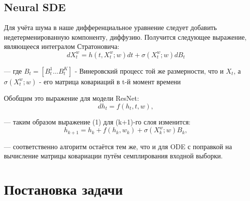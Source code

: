 \documentclass{article}
\begin{document}
   \subsection{Neural SDE}
      \par Для учёта шума в наше дифференциальное уравнение следует добавить недетерменированную компоненту, диффузию. Получится следующее выражение, являющееся интегралом Стратоновича:
      \begin{equation} dX_t^w = h(t, X_t^w; w) dt + \sigma(X_t^w;w) dB_t     \end{equation}
      \par --- где $B_t=[B_t^1...B_t^K]$ - Винеровский процесс той же размерности, что и $X_t$, а $\sigma(X_t^w;w)$ - его матрица ковариаций в t-й момент времени
      \par Обобщим это выражение для модели ResNet:
      \begin{equation}  dh_t = f(h_t, t, w),    \end{equation}
      \par --- таким образом выражение (1) для (k+1)-го слоя изменится:
      \begin{equation} h_{k+1} = h_k + f(h_k, w_k) +  \sigma(X_k^w;w) B_k,    \end{equation}
      \par --- соответственно алгоритм остаётся тем же, что и для ODE с поправкой на вычисление матрицы ковариации путём семплирования входной выборки.

\section{Постановка задачи}
   
\end{document}

